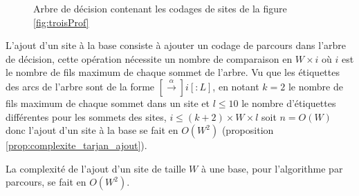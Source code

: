 \begin{figure}[h]
\begin{center}
\end{center}
\caption{Arbre de décision contenant les codages de sites de la figure \ref{fig:troisProf}}
\label{fig:arbreDecTarjan}
\end{figure}

L'ajout d'un site à la base consiste à ajouter un codage de parcours dans l'arbre de décision, cette opération nécessite un nombre de comparaison en $W\times i$ où $i$ est le nombre de fils maximum de chaque sommet de l'arbre. Vu que les étiquettes des arcs de l'arbre sont de la forme $[\xrightarrow{\alpha}]i[:L]$, en notant $k=2$ le nombre de fils maximum de chaque sommet dans un site et $l\leq 10$ le nombre d'étiquettes différentes pour les sommets des sites, $i\leq (k+2)\times W\times l$ soit $n=O(W)$ donc l'ajout d'un site à la base se fait en $O(W^2)$ (proposition \ref{prop:complexite_tarjan_ajout}).

\begin{prop}
 La complexité de l'ajout d'un site de taille $W$ à une base, pour l'algorithme par parcours, se fait en $O(W^2)$.
\label{prop:complexite_tarjan_ajout}
\end{prop}



